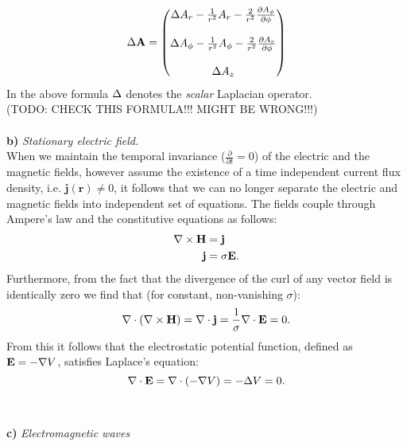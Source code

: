 \begin{equation*}
  \Delta \mathbf{A} =
  \begin{pmatrix} 
    \Delta A_r - \frac{1}{r^2}A_r-\frac{2}{r^2}\frac{\partial A_\phi}{\partial \phi} \\ \\
    \Delta A_\phi - \frac{1}{r^2}A_\phi-\frac{2}{r^2}\frac{\partial A_r}{\partial \phi} \\ \\    
    \Delta A_z
  \end{pmatrix}
\end{equation*}  
In the above formula $\Delta$ denotes the \emph{scalar} Laplacian operator. \\ 
(TODO: CHECK THIS FORMULA!!! MIGHT BE WRONG!!!)\\\\
\textbf{b)} \emph{Stationary electric field.} \\

When we maintain the temporal invariance ($\frac{\partial}{\partial t}=0$) of the electric and the magnetic fields, however assume the existence of a time independent current flux density, i.e. $\bm{j}(\bm{r}) \neq 0 $, it follows that we can no longer separate the electric and magnetic fields into independent set of equations. The fields couple through Ampere's law and the constitutive equations as follows:
\begin{align*}
  \mathbf{\nabla}\times \mathbf{H} &= \mathbf{j}\\
  \mathbf{j} &= \sigma \mathbf{E}. 
\end{align*}
Furthermore, from the fact that the divergence of the curl of any vector field is identically zero we find that (for constant, non-vanishing $\sigma$): 
\begin{equation*}
  \mathbf{\nabla}\cdot (\mathbf{\nabla}\times \mathbf{H}) = \mathbf{\nabla}\cdot \mathbf{j} = \frac{1}{\sigma}\mathbf{\nabla}\cdot \mathbf{E} = 0. 
\end{equation*}
From this it follows that the electrostatic potential function, defined as $\mathbf{E}=-\mathbf{\nabla} V$, satisfies Laplace's equation:
\begin{equation*}
  \mathbf{\nabla}\cdot \mathbf{E} = \mathbf{\nabla}\cdot (-\mathbf{\nabla} V) = -\Delta V = 0. 
\end{equation*}\\\\
\textbf{c)} \emph{Electromagnetic waves}\\

